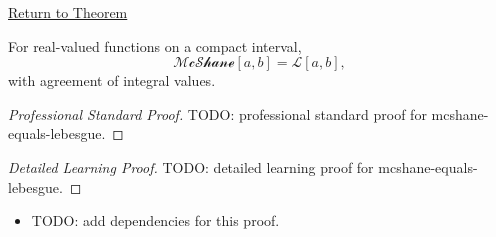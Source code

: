 \newpage
{}
\label{prf:mcshane-equals-lebesgue}
\begin{remark*}[Return]\hyperref[thm:mcshane-equals-lebesgue]{Return to Theorem}\end{remark*}

\begin{theorem*}
For real-valued functions on a compact interval,
\[
  \mathcal{McShane}[a,b]=\mathcal L[a,b],
\]
with agreement of integral values.
\end{theorem*}

\begin{proof}[Professional Standard Proof]
\LRAProofBodyStart
TODO: professional standard proof for mcshane-equals-lebesgue.
\end{proof}

\begin{proof}[Detailed Learning Proof]
\LRAProofBodyStart
TODO: detailed learning proof for mcshane-equals-lebesgue.
\end{proof}

\begin{remark*}
\end{remark*}

\begin{dependencies}
\begin{itemize}
  \item TODO: add dependencies for this proof.
\end{itemize}
\end{dependencies}

\clearpage
